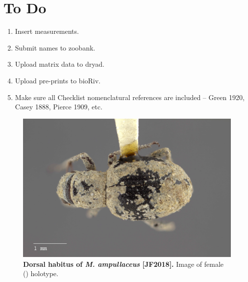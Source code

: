 \documentclass[fleqn,10pt,lineno]{wlpeerj} %
\begin{document}
\section*{To Do}
	\begin{enumerate}[itemsep=-0.4em]
		\item Insert measurements.
		\item Submit names to zoobank.
		\item Upload matrix data to dryad.
		\item Upload pre-prints to bioR{\textchi}iv.
		\item Make sure all Checklist nomenclatural references are included -- Green 1920, Casey 1888, Pierce 1909, etc.
	\end{enumerate}

\newpage
 

\newpage

\begin{figure}[h]
	\begin{sideways}
		\centering
		\includegraphics[height=\textwidth]{ampullaceus_F_dorsal.jpg}
	\end{sideways}
	\caption{\textbf{Dorsal habitus of \textit{M. ampullaceus} [JF2018].} Image of female (\female) holotype.}
	\label{fig:ampullaceus_F_dorsal}
\end{figure}
\end{document}
